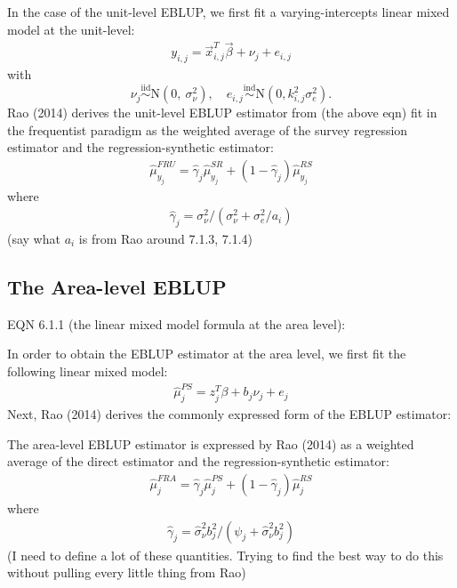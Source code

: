 \documentclass[12pt,twoside]{reedthesis}
\begin{document}
In the case of the unit-level EBLUP, we first fit a varying-intercepts linear mixed model at the unit-level:
\begin{align}
y_{i,j} = \vec x_{i,j}^T \vec \beta + \nu_j + e_{i,j}
\end{align}
with
\[
 \newcommand\myeq{\stackrel{\mathclap{\normalfont\mbox{s}}}{~}}
\nu_j \stackrel{\text{iid}}{\sim} \text{N}(0,~ \sigma^2_{\nu}), \quad e_{i,j} \stackrel{\text{ind}}{\sim}\text{N}(0, k^2_{i,j}\sigma^2_e).
\]
Rao (2014) derives the unit-level EBLUP estimator from (the above eqn) fit in the frequentist paradigm as the weighted average of the survey regression estimator and the regression-synthetic estimator:
\begin{align}
\hat \mu_{y_j}^{FRU} = \hat \gamma_j \hat\mu_{y_j}^{SR} + (1 - \hat \gamma_j) \hat\mu_{y_j}^{RS}
\end{align}
where
\begin{align}
\hat\gamma_j = \sigma^2_\nu / (\sigma^2_\nu + \sigma^2_e / a_i)
\end{align}
(say what \(a_i\) is from Rao around 7.1.3, 7.1.4)

\hypertarget{the-area-level-eblup}{%
\subsection{The Area-level EBLUP}\label{the-area-level-eblup}}

EQN 6.1.1 (the linear mixed model formula at the area level):

In order to obtain the EBLUP estimator at the area level, we first fit the following linear mixed model:
\begin{align}
\hat\mu_{j}^{PS} = z_j^T \beta + b_j \nu_j + e_j
\end{align}
Next, Rao (2014) derives the commonly expressed form of the EBLUP estimator:

The area-level EBLUP estimator is expressed by Rao (2014) as a weighted average of the direct estimator and the regression-synthetic estimator:
\begin{align}
\hat \mu_j^{FRA} = \hat\gamma_j \hat\mu_j^{PS} + (1 - \hat\gamma_j) \hat\mu_j^{RS}
\end{align}
where
\begin{align}
\hat \gamma_j = \hat \sigma_\nu^2 b_j^2 / (\psi_j + \hat\sigma_\nu^2 b_j^2)
\end{align}
(I need to define a lot of these quantities. Trying to find the best way to do this without pulling every little thing from Rao)
\end{document}
